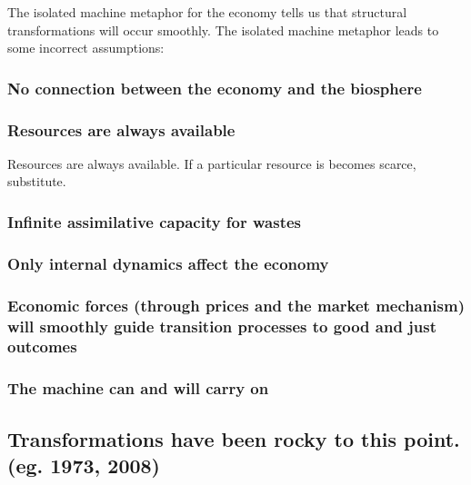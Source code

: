 The isolated machine metaphor for the economy tells us that structural transformations will occur smoothly. 
     The isolated machine metaphor leads to some incorrect assumptions:

\subsubsection{No connection between the economy and the biosphere}
\label{sec:no_connection}

\subsubsection{Resources are always available}
\label{sec:infinite_resources}

Resources are always available.  If a particular resource is becomes scarce, substitute.

\subsubsection{Infinite assimilative capacity for wastes}
\label{sec:infinite_waste}

\subsubsection{Only internal dynamics affect the economy}
\label{sec:internal_dynamics}

\subsubsection{Economic forces (through prices and the market mechanism) will smoothly guide transition processes to good and just outcomes}
\label{sec:economic_forces}


\subsubsection{The machine can and will carry on}
\label{sec:machine_endures}

\subsection{Transformations have been rocky to this point. (eg. 1973, 2008)}
\label{sec:transformations}

